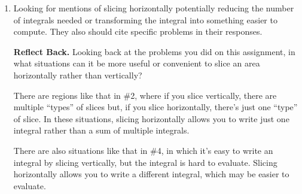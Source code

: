 \documentclass{article}
\begin{document}
\begin{enumerate}
\begin{solution}
    $x$-value) $-$ (left $x$-value).  The right $x$-value is $\cos(y_k)$, since $y=\arccos(x)$ can be rewritten as $x=\cos(y)$ and the left $x$-value is 0. 
  Therefore,
    \[ \text{area of $k$-th slice} \approx \left( 
      \cos y_k -0 \right)  \Delta y.\] Summing the areas of all the slices and
    taking the limit as the number of slices $\to \infty$, the area of the
    region is 
    \begin{align*}
      \int_0^{\pi/2} \left( \cos y - 0 \right) dy &=
      \left. \sin y \right|_0^{\pi/2} \\
      &= \left( 
    \sin(\tfrac{\pi}{2}) - \sin(0) \right) \\
      &= \boxed{1-0 = 1}
    \end{align*}
  \end{solution}


\item

\begin{grading}
    Looking for mentions of slicing horizontally potentially reducing the number of integrals needed or transforming the integral into something easier to compute. They also should cite specific problems in their responses.
\end{grading}

  \begin{problem}[\vfill]
    \textbf{Reflect Back.}  Looking back at the problems you did on this
    assignment, in what situations can it be more useful or convenient to
    slice an area horizontally rather than vertically?
  \end{problem}  

  \begin{solution}
    There are regions like that in {{\#2}}, where if you
    slice vertically, there are multiple ``types'' of slices but, if you
    slice horizontally, there's just one ``type'' of slice.  In these
    situations, slicing horizontally allows you to write just one integral
    rather than a sum of multiple integrals.

    There are also situations like that in {{\#4}}, in
    which it's easy to write an integral by slicing vertically, but the
    integral is hard to evaluate.  Slicing horizontally allows you to
    write a different integral, which may be easier to evaluate. 
  \end{solution}

\end{enumerate}

\end{document}
